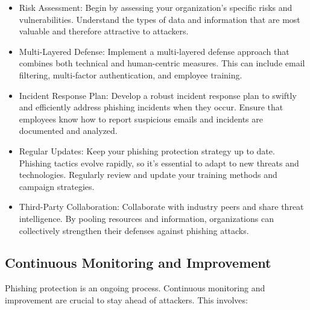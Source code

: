 \documentclass[conference]{IEEEtran}
\begin{document}
\begin{itemize}

\item Risk Assessment: Begin by assessing your organization's specific risks and vulnerabilities. Understand the types of data and information that are most valuable and therefore attractive to attackers.

\item  Multi-Layered Defense: Implement a multi-layered defense approach that combines both technical and human-centric measures. This can include email filtering, multi-factor authentication, and employee training.

\item  Incident Response Plan: Develop a robust incident response plan to swiftly and efficiently address phishing incidents when they occur. Ensure that employees know how to report suspicious emails and incidents are documented and analyzed.

\item Regular Updates: Keep your phishing protection strategy up to date. Phishing tactics evolve rapidly, so it's essential to adapt to new threats and technologies. Regularly review and update your training methods and campaign strategies.

\item  Third-Party Collaboration: Collaborate with industry peers and share threat intelligence. By pooling resources and information, organizations can collectively strengthen their defenses against phishing attacks.

\end{itemize}



\subsection{ Continuous Monitoring and Improvement }
Phishing protection is an ongoing process. Continuous monitoring and improvement are crucial to stay ahead of attackers. This involves:
\end{document}
